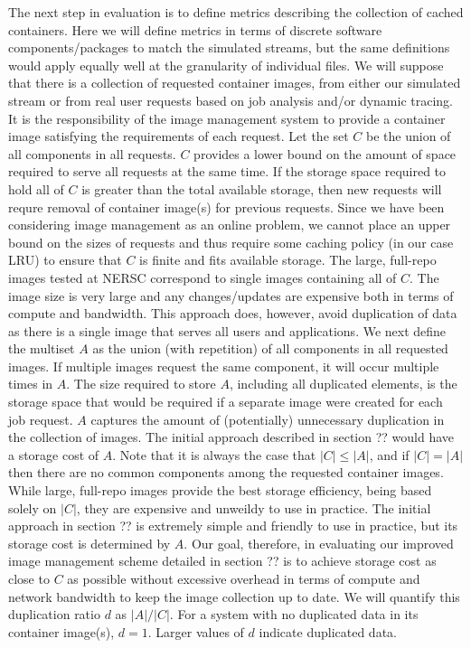 \documentclass[sigconf]{acmart}
\begin{document}
The next step in evaluation is to define metrics describing the collection of cached containers.
Here we will define metrics in terms of discrete software components/packages to match the simulated streams,
but the same definitions would apply equally well at the granularity of individual files.
We will suppose that there is a collection of requested container images,
from either our simulated stream or from real user requests based on job analysis and/or dynamic tracing.
It is the responsibility of the image management system to provide a container image satisfying the requirements of each request.
Let the set $C$ be the union of all components in all requests.
$C$ provides a lower bound on the amount of space required to serve all requests at the same time.
If the storage space required to hold all of $C$ is greater than the total available storage,
then new requests will requre removal of container image(s) for previous requests.
Since we have been considering image management as an online problem,
we cannot place an upper bound on the sizes of requests and thus require some caching policy
(in our case LRU) to ensure that $C$ is finite and fits available storage.
The large, full-repo images tested at NERSC correspond to single images containing all of $C$.
The image size is very large and any changes/updates are expensive both in terms of compute and bandwidth.
This approach does, however,
avoid duplication of data as there is a single image that serves all users and applications.
We next define the multiset $A$ as the union (with repetition) of all components in all requested images.
If multiple images request the same component,
it will occur multiple times in $A$.
The size required to store $A$,
including all duplicated elements,
is the storage space that would be required if a separate image were created for each job request.
$A$ captures the amount of (potentially) unnecessary duplication in the collection of images.
The initial approach described in section ?? would have a storage cost of $A$.
Note that it is always the case that $|C| \leq |A|$,
and if $|C| = |A|$ then there are no common components among the requested container images.
While large, full-repo images provide the best storage efficiency, being based solely on $|C|$,
they are expensive and unweildy to use in practice.
The initial approach in section ?? is extremely simple and friendly to use in practice,
but its storage cost is determined by $A$.
Our goal, therefore, in evaluating our improved image management scheme detailed in section ?? is to achieve storage cost as close to $C$ as possible without excessive overhead in terms of compute and network bandwidth to keep the image collection up to date.
We will quantify this duplication ratio $d$ as $|A| / |C|$.
For a system with no duplicated data in its container image(s),
$d=1$.
Larger values of $d$ indicate duplicated data.
\end{document}
